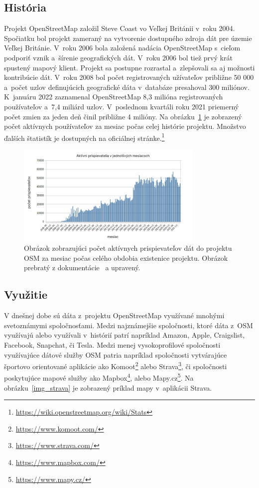 \subsection*{História}
Projekt OpenStreetMap založil Steve Coast vo Veľkej Británii v~roku 2004. Spočiatku bol projekt zameraný na vytvorenie dostupného zdroja dát pre územie Veľkej Británie. V~roku 2006 bola založená nadácia OpenStreetMap s~cieľom podporiť vznik a~šírenie geografických dát. V~roku 2006 bol tiež prvý krát spustený mapový klient. Projekt sa postupne rozrastal a~zlepšovali sa aj možnosti kontribúcie dát. V~roku 2008 bol počet registrovaných užívateľov približne 50 000 a~počet uzlov definujúcich geografické dáta v~databáze presahoval 300 miliónov. K~januáru 2022 zaznamenal OpenStreetMap 8,3 milióna registrovaných používateľov a~7,4 miliárd uzlov. V~poslednom kvartáli roku 2021 priemerný počet zmien za jeden deň činil približne 4 milióny. Na obrázku~\ref{img_osm_contrib} je zobrazený počet aktívnych používateľov za mesiac počas celej histórie projektu. Množstvo ďalších štatistík je dostupných na oficiálnej stránke.\footnote{\url{https://wiki.openstreetmap.org/wiki/Stats}}

\begin{figure}[hbt]
	\centering
	\includegraphics[width=0.8\textwidth]{obrazky-figures/osm_contributors.png}
	\caption{Obrázok zobrazujúci počet aktívnych prispievateľov dát do projektu OSM za mesiac počas celého obdobia existenice projektu. Obrázok prebratý z dokumentácie~\cite{osm_contributors} a upravený.}
	\label{img_osm_contrib}
\end{figure}


\subsection*{Využitie}
V dnešnej dobe sú dáta z~projektu OpenStreetMap využívané mnohými svetoznámymi spoločnosťami. Medzi najznámejšie spoločnosti, ktoré dáta z~OSM využívajú alebo využívali v~histórií patrí napríklad Amazon, Apple, Craigslist, Facebook, Snapchat, či Tesla. Medzi menej vysokoprofilové spoločnosti využívajúce dátové služby OSM patria napríklad spoločnosti vytvárajúce športovo orientované aplikácie ako Komoot\footnote{\url{https://www.komoot.com/}} alebo Strava\footnote{\url{https://www.strava.com/}}, či spoločnosti poskytujúce mapové služby ako Mapbox\footnote{\url{https://www.mapbox.com/}}, alebo Mapy.cz\footnote{\url{https://www.mapy.cz/}}. Na obrázku~\ref{img_strava} je zobrazený príklad mapy v~aplikácii Strava. 

